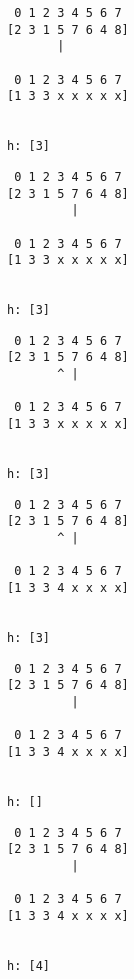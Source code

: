 { \begin{verbatim}
                    0 1 2 3 4 5 6 7
                   [2 3 1 5 7 6 4 8]
                          |

                    0 1 2 3 4 5 6 7
                   [1 3 3 x x x x x]


                   h: [3]
\end{verbatim} }

{ \begin{verbatim}
                    0 1 2 3 4 5 6 7
                   [2 3 1 5 7 6 4 8]
                            |

                    0 1 2 3 4 5 6 7
                   [1 3 3 x x x x x]


                   h: [3]
\end{verbatim} }

{ \begin{verbatim}
                    0 1 2 3 4 5 6 7
                   [2 3 1 5 7 6 4 8]
                          ^ |

                    0 1 2 3 4 5 6 7
                   [1 3 3 x x x x x]


                   h: [3]
\end{verbatim} }

{ \begin{verbatim}
                    0 1 2 3 4 5 6 7
                   [2 3 1 5 7 6 4 8]
                          ^ |

                    0 1 2 3 4 5 6 7
                   [1 3 3 4 x x x x]


                   h: [3]
\end{verbatim} }

{ \begin{verbatim}
                    0 1 2 3 4 5 6 7
                   [2 3 1 5 7 6 4 8]
                            |

                    0 1 2 3 4 5 6 7
                   [1 3 3 4 x x x x]


                   h: []
\end{verbatim} }

{ \begin{verbatim}
                    0 1 2 3 4 5 6 7
                   [2 3 1 5 7 6 4 8]
                            |

                    0 1 2 3 4 5 6 7
                   [1 3 3 4 x x x x]


                   h: [4]
\end{verbatim} }

